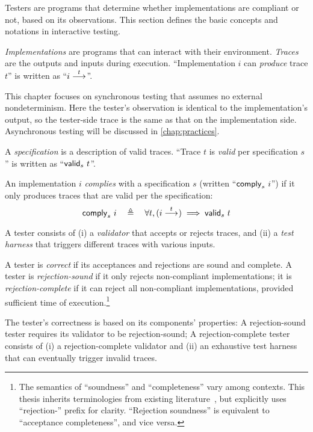 Testers are programs that determine whether implementations are compliant or
not, based on its observations.  This section defines the basic concepts and
notations in interactive testing.

\begin{definition}
  {\em Implementations} are programs that can interact with their environment.
  {\em Traces} are the outputs and inputs during execution.  ``Implementation
  $i$ can {\em produce} trace $t$'' is written as ``$i\overset{t}\longrightarrow_{}$''.
\end{definition}

This chapter focuses on synchronous testing that assumes no external
nondeterminism.  Here the tester's observation is identical to the
implementation's output, so the tester-side trace is the same as that on the
implementation side.  Asynchronous testing will be discussed in
\autoref{chap:practices}.

\begin{definition}
  A {\em specification} is a description of valid traces.  ``Trace $t$ is {\em
    valid} per specification $s$'' is written as ``$\mathsf{valid}_{s}~{t}$''.

  An implementation $i$ {\em complies} with a specification $s$ (written
  ``$\mathsf{comply}_{s}~{i}$'') if it only produces traces that are valid per the
  specification:
  \[\mathsf{comply}_{s}~{i}\quad\triangleq\quad\forall t,(i\overset{t}\longrightarrow_{})\implies\mathsf{valid}_{s}~{t}\]
\end{definition}

\begin{definition}
  A tester consists of (i) a {\em validator} that accepts or rejects traces, and
  (ii) a {\em test harness} that triggers different traces with various inputs.

  A tester is {\em correct} if its acceptances and rejections are sound and
  complete.  A tester is {\em rejection-sound} if it only rejects non-compliant
  implementations; it is {\em rejection-complete} if it can reject all
  non-compliant implementations, provided sufficient time of
  execution.\footnote{The semantics of ``soundness'' and ``completeness'' vary
    among contexts.  This thesis inherits terminologies from existing
    literature~\cite{Tretmans}, but explicitly uses ``rejection-'' prefix for
    clarity.  ``Rejection soundness'' is equivalent to ``acceptance
    completeness'', and vice versa.}

  The tester's correctness is based on its components' properties: A
  rejection-sound tester requires its validator to be rejection-sound; A
  rejection-complete tester consists of (i) a rejection-complete validator
  and (ii) an exhaustive test harness that can eventually trigger invalid
  traces.
\end{definition}

